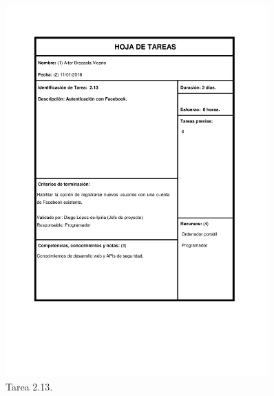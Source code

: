 \documentclass{DeustoFDP}
\begin{document}
\begin{figure}[H]
    \centering
    \includegraphics[width=0.9\textwidth]{fig/Tareas/213}
    \caption{Tarea 2.13.}
    \label{fig:t213}
\end{figure}
\end{document}
